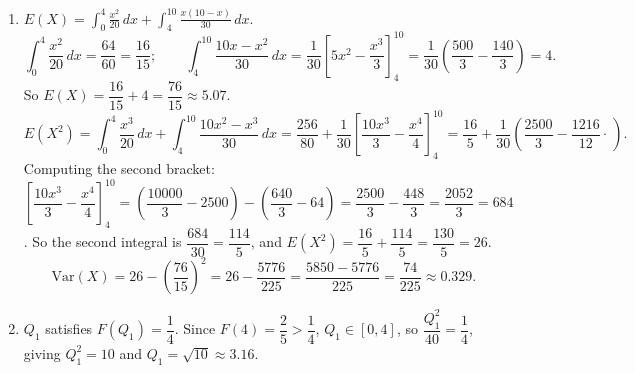 \documentclass[11pt]{article}
\begin{document}
\begin{corrige}
\begin{enumerate}
\item $E(X)=\displaystyle\int_0^4 \frac{x^2}{20}\,dx+\int_4^{10}\frac{x(10-x)}{30}\,dx$.
\[
\int_0^4 \frac{x^2}{20}\,dx=\frac{64}{60}=\frac{16}{15};\qquad
\int_4^{10}\frac{10x-x^2}{30}\,dx=\frac{1}{30}\left[5x^2-\frac{x^3}{3}\right]_4^{10}=\frac{1}{30}\left(\frac{500}{3}-\frac{140}{3}\right)=4.
\]
So $E(X)=\dfrac{16}{15}+4=\dfrac{76}{15}\approx 5.07$.
\[
E(X^2)=\int_0^4 \frac{x^3}{20}\,dx+\int_4^{10}\frac{10x^2-x^3}{30}\,dx
=\frac{256}{80}+\frac{1}{30}\left[\frac{10x^3}{3}-\frac{x^4}{4}\right]_4^{10}
=\frac{16}{5}+\frac{1}{30}\left(\frac{2500}{3}-\frac{1216}{12}\cdot\frac{}{}\right).
\]
Computing the second bracket: $\left[\dfrac{10x^3}{3}-\dfrac{x^4}{4}\right]_4^{10}=\left(\dfrac{10000}{3}-2500\right)-\left(\dfrac{640}{3}-64\right)=\dfrac{2500}{3}-\dfrac{448}{3}=\dfrac{2052}{3}=684$. So the second integral is $\dfrac{684}{30}=\dfrac{114}{5}$, and $E(X^2)=\dfrac{16}{5}+\dfrac{114}{5}=\dfrac{130}{5}=26$.
\[
\mathrm{Var}(X)=26-\left(\frac{76}{15}\right)^2=26-\frac{5776}{225}=\frac{5850-5776}{225}=\frac{74}{225}\approx 0.329.
\]

\item $Q_1$ satisfies $F(Q_1)=\dfrac14$. Since $F(4)=\dfrac25>\dfrac14$, $Q_1\in[0,4]$, so $\dfrac{Q_1^2}{40}=\dfrac14$, giving $Q_1^2=10$ and $Q_1=\sqrt{10}\approx 3.16$.
\end{enumerate}
\end{corrige}
\end{document}
